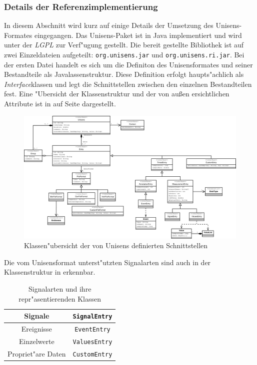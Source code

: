 \subsubsection{Details der Referenzimplementierung}

In diesem Abschnitt wird kurz auf einige Details der Umsetzung des Unisens-Formates eingegangen.
Das Unisens-Paket ist in Java implementiert und wird unter der \emph{\ac{LGPL}} zur Verf"ugung gestellt.
Die bereit gestellte Bibliothek ist auf zwei Einzeldateien aufgeteilt: \verb|org.unisens.jar| und \verb|org.unisens.ri.jar|.
Bei der ersten Datei handelt es sich um die Definiton des Unisensformates und seiner Bestandteile als Javalassenstruktur.
Diese Definition erfolgt haupts"achlich als \emph{Interface}klassen und legt die Schnittstellen zwischen den einzelnen Bestandteilen fest.
Eine "Ubersicht der Klassenstruktur und der von au\ss en ersichtlichen Attribute ist in  auf Seite \pageref{pic:unisens_interface} dargestellt.
\begin{figure}
\includegraphics[width=\textwidth]{bilder/unisens_interface_.eps}
\caption{Klassen"ubersicht der von Unisens definierten Schnittstellen}
\label{pic:unisens_interface}
\end{figure}
Die vom Unisensformat unterst"utzten Signalarten sind auch in der Klassenstruktur in  erkennbar.
\begin{table}[h]
\centering
\begin{tabular}{|c|c|}
	\hline Signale & \verb|SignalEntry| \\
	\hline Ereignisse & \verb|EventEntry| \\
	\hline Einzelwerte & \verb|ValuesEntry| \\
	\hline Propriet"are Daten & \verb|CustomEntry| \\
	\hline
\end{tabular}
\caption{Signalarten und ihre repr"asentierenden Klassen}
\label{tab:unisens_signalklassen}
\end{table}

